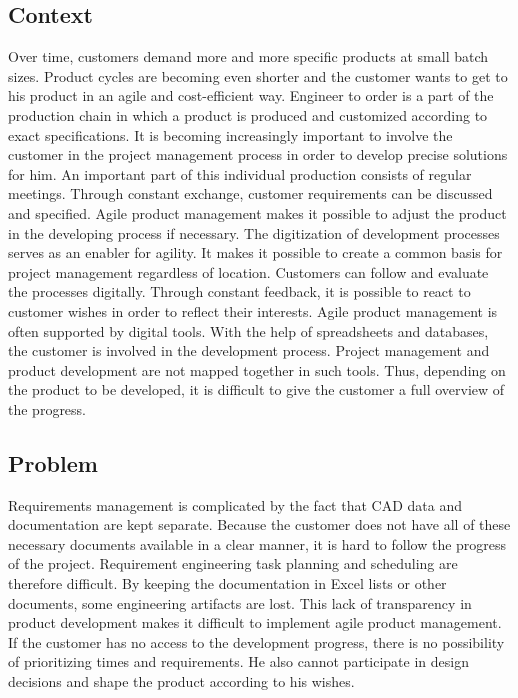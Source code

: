     \subsection*{Context}
    Over time, customers demand more and more specific products at small batch sizes. Product cycles are becoming even shorter and the customer wants to get to his product in an agile and cost-efficient way. Engineer to order is a part of the production chain in which a product is produced and customized according to exact specifications. It is becoming increasingly important to involve the customer in the project management process in order to develop precise solutions for him. 
    An important part of this individual production consists of regular meetings. Through constant exchange, customer requirements can be discussed and specified. Agile product management makes it possible to adjust the product in the developing process if necessary. 
    The digitization of development processes serves as an enabler for agility. It makes it possible to create a common basis for project management regardless of location. Customers can follow and evaluate the processes digitally. Through constant feedback, it is possible to react to customer wishes in order to reflect their interests. Agile product management is often supported by digital tools. With the help of spreadsheets and databases, the customer is involved in the development process. Project management and product development are not mapped together in such tools. Thus, depending on the product to be developed, it is difficult to give the customer a full overview of the progress.

    \subsection*{Problem}
    Requirements management is complicated by the fact that CAD data and documentation are kept separate. Because the customer does not have all of these necessary documents available in a clear manner, it is hard to follow the progress of the project. Requirement engineering task planning and scheduling are therefore difficult. By keeping the documentation in Excel lists or other documents, some engineering artifacts are lost. This lack of transparency in product development makes it difficult to implement agile product management. If the customer has no access to the development progress, there is no possibility of prioritizing times and requirements. He also cannot participate in design decisions and shape the product according to his wishes.

